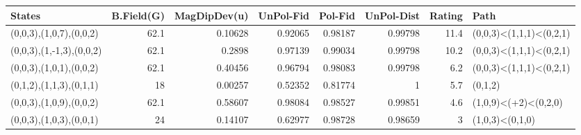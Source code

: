 \begin{tabular}{lrrrrrrl}
\hline
 States                   &   B.Field(G) &   MagDipDev(u) &   UnPol-Fid &   Pol-Fid &   UnPol-Dist &   Rating & Path                    \\
\hline
 (0,0,3),(1,0,7),(0,0,2)  &         62.1 &        0.10628 &     0.92065 &   0.98187 &      0.99798 &     11.4 & (0,0,3)<(1,1,1)<(0,2,1) \\
 (0,0,3),(1,-1,3),(0,0,2) &         62.1 &        0.2898  &     0.97139 &   0.99034 &      0.99798 &     10.2 & (0,0,3)<(1,1,1)<(0,2,1) \\
 (0,0,3),(1,0,1),(0,0,2)  &         62.1 &        0.40456 &     0.96794 &   0.98083 &      0.99798 &      6.2 & (0,0,3)<(1,1,1)<(0,2,1) \\
 (0,1,2),(1,1,3),(0,1,1)  &         18   &        0.00257 &     0.52352 &   0.81774 &      1       &      5.7 & (0,1,2)                 \\
 (0,0,3),(1,0,9),(0,0,2)  &         62.1 &        0.58607 &     0.98084 &   0.98527 &      0.99851 &      4.6 & (1,0,9)<(+2)<(0,2,0)    \\
 (0,0,3),(1,0,3),(0,0,1)  &         24   &        0.14107 &     0.62977 &   0.98728 &      0.98659 &      3   & (1,0,3)<(0,1,0)         \\
\hline
\end{tabular}